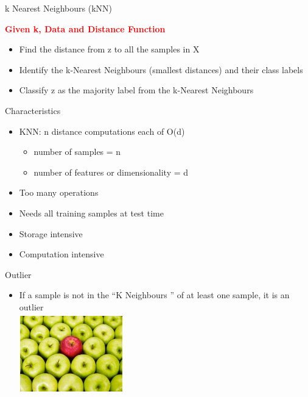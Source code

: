 \documentclass[aspectratio=169,14pt,usenames,dvipsnames]{beamer}
\begin{document}
\begin{frame}{k Nearest Neighbours (kNN)}
\begin{tcolorbox}[width=13cm,left=0pt,boxrule=0.2pt,sharp corners, right=0pt,colback={lgreen!60!white}]
\textbf{\textcolor{red}{Given k, Data and Distance Function}}
\begin{itemize}
\item Find the distance from z to all the samples in X
\item Identify the k-Nearest Neighbours (smallest distances) and their class          labels
\item Classify z as the majority label from the k-Nearest Neighbours
\end{itemize}
\end{tcolorbox}
\end{frame}
	
\begin{frame}{Characteristics}
\begin{itemize}
\item KNN: n distance computations each of O(d) \\
\begin{itemize} \item number of samples = n
		\item  number of features or dimensionality = d
\end{itemize}
\item Too many operations
\item Needs all training samples at test time
\item Storage intensive
\item Computation intensive
\end{itemize}
\end{frame}


\begin{frame}{Outlier}
\begin{itemize}
\item If a sample is not in the “K Neighbours ” of at least one sample, it is an outlier \\
\centering
\includegraphics[width=4.5cm , height=3.5cm]{Images/12knn.png}
\end{itemize}
\end{frame}
\end{document}
